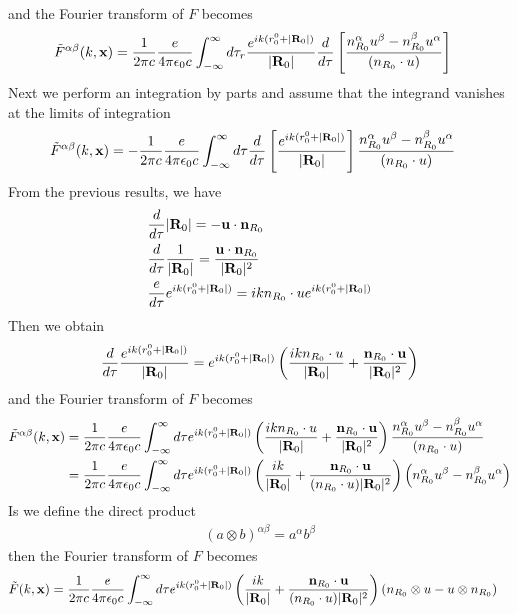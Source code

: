 and the Fourier transform of $F$ becomes
\begin{align}
    \tilde F^{\alpha\beta}(k,{\bf x}) & =\frac1{2\pi c}\frac{e}{4\pi\epsilon_0c}\int_{-\infty}^{\infty}d\tau_r \frac{e^{ik (r_0^0 + |{\bf R}_0|)}}{|{\bf R}_0|}\frac{d}{d\tau}\left[\frac{n_{R_0}^\alpha u^\beta-n_{R_0}^\beta u^\alpha}{(n_{R_0}\cdot u)}\right]
\end{align}
Next we perform an integration by parts and assume that the integrand vanishes at the limits of integration
\begin{align}
    \tilde F^{\alpha\beta}(k,{\bf x}) & =-\frac1{2\pi c}\frac{e}{4\pi\epsilon_0c}\int_{-\infty}^{\infty}d\tau \frac{d}{d\tau}\left[\frac{e^{ik (r_0^0 + |{\bf R}_0|)}}{|{\bf R}_0|}\right]\frac{n_{R_0}^\alpha u^\beta-n_{R_0}^\beta u^\alpha}{(n_{R_0}\cdot u)}
\end{align}
From the previous results, we have
\begin{align}
     & \frac{d}{d\tau}|{\bf R}_0| = -{\bf u}\cdot{\bf n}_{R_0}                                 \\
     & \frac{d}{d\tau}\frac1{|{\bf R}_0|} = \frac{{\bf u}\cdot{\bf n}_{R_0}}{|{\bf R}_0|^2}    \\
     & \frac{e}{d\tau} e^{ik(r_0^0+|{\bf R}_0|)} =i k n_{R_0}\cdot u e^{ik(r_0^0+|{\bf R}_0|)}
\end{align}
Then we obtain
\begin{align}
    \frac{d}{d\tau} \frac{e^{ik(r_0^0+|{\bf R}_0|)}}{|{\bf R}_0|} =e^{ik(r_0^0+|{\bf R}_0|)}\left(\frac{ik n_{R_0}\cdot u}{|{\bf R}_0|}+\frac{{\bf n}_{R_0}\cdot {\bf u}}{|{\bf R}_0|^2}\right)
\end{align}
and the Fourier transform of $F$ becomes
\begin{align}
    \tilde F^{\alpha\beta}(k,{\bf x}) & =\frac1{2\pi c}\frac{e}{4\pi\epsilon_0c}\int_{-\infty}^\infty d\tau e^{ik(r_0^0+|{\bf R}_0|)}\left(\frac{ik n_{R_0}\cdot u}{|{\bf R}_0|}+\frac{{\bf n}_{R_0}\cdot {\bf u}}{|{\bf R}_0|^2}\right)\frac{n_{R_0}^\alpha u^\beta-n_{R_0}^\beta u^\alpha}{(n_{R_0}\cdot u)}\nonumber \\
                                      & =\frac1{2\pi c}\frac{e}{4\pi\epsilon_0c}\int_{-\infty}^\infty d\tau e^{ik(r_0^0+|{\bf R}_0|)}\left(\frac{ik }{|{\bf R}_0|}+\frac{{\bf n}_{R_0}\cdot {\bf u}}{(n_{R_0}\cdot u)|{\bf R}_0|^2}\right)\left(n_{R_0}^\alpha u^\beta-n_{R_0}^\beta u^\alpha\right)
\end{align}
Is we define the direct product
\begin{align}
    (a\otimes b)^{\alpha\beta}=a^\alpha b^\beta
\end{align}
then the Fourier transform of $F$ becomes
\begin{align}
    \tilde F(k,{\bf x}) & =\frac1{2\pi c}\frac{e}{4\pi\epsilon_0c}\int_{-\infty}^\infty d\tau e^{ik(r_0^0+|{\bf R}_0|)}\left(\frac{ik }{|{\bf R}_0|}+\frac{{\bf n}_{R_0}\cdot {\bf u}}{(n_{R_0}\cdot u)|{\bf R}_0|^2}\right)\left(n_{R_0}\otimes u - u \otimes n_{R_0}\right)
\end{align}
